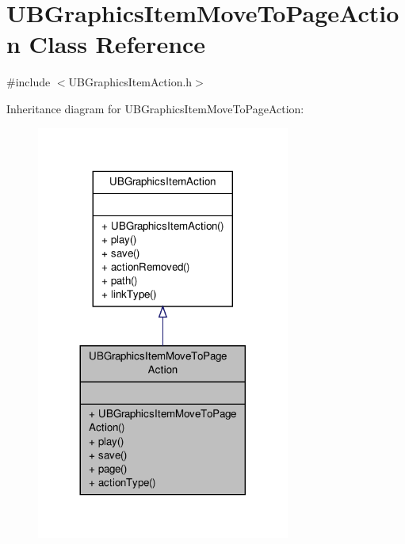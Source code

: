 \hypertarget{class_u_b_graphics_item_move_to_page_action}{\section{U\-B\-Graphics\-Item\-Move\-To\-Page\-Action Class Reference}
\label{de/dfb/class_u_b_graphics_item_move_to_page_action}
}


{\ttfamily \#include $<$U\-B\-Graphics\-Item\-Action.\-h$>$}



Inheritance diagram for U\-B\-Graphics\-Item\-Move\-To\-Page\-Action\-:
\nopagebreak
\begin{figure}[H]
\begin{center}
\leavevmode
\includegraphics[width=236pt]{d7/d64/class_u_b_graphics_item_move_to_page_action__inherit__graph}
\end{center}
\end{figure}


